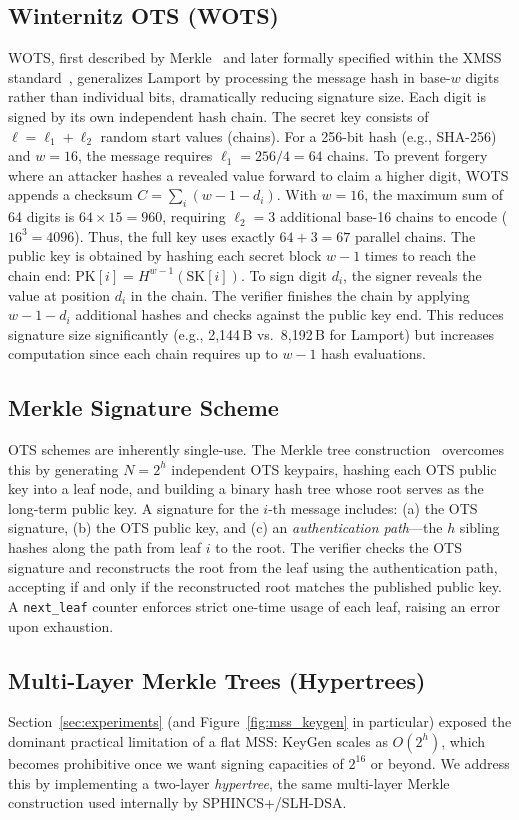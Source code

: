 \documentclass[10pt,a4paper,twocolumn]{article}
\begin{document}
\subsection{Winternitz OTS (WOTS)}
WOTS, first described by Merkle~\cite{merkle1989} and later formally specified within the XMSS standard~\cite{xmss}, generalizes Lamport by processing the message hash in base-$w$ digits rather than individual bits, dramatically reducing signature size. Each digit is signed by its own independent hash chain. The secret key consists of $\ell = \ell_1 + \ell_2$ random start values (chains). For a 256-bit hash (e.g., SHA-256) and $w=16$, the message requires $\ell_1 = 256 / 4 = 64$ chains. 
To prevent forgery where an attacker hashes a revealed value forward to claim a higher digit, WOTS appends a checksum $C = \sum_i (w - 1 - d_i)$. With $w=16$, the maximum sum of 64 digits is $64 \times 15 = 960$, requiring $\ell_2 = 3$ additional base-16 chains to encode ($16^3 = 4096$). Thus, the full key uses exactly $64 + 3 = 67$ parallel chains.
The public key is obtained by hashing each secret block $w-1$ times to reach the chain end: $\text{PK}[i] = H^{w-1}(\text{SK}[i])$. To sign digit $d_i$, the signer reveals the value at position $d_i$ in the chain. The verifier finishes the chain by applying $w-1-d_i$ additional hashes and checks against the public key end. This reduces signature size significantly (e.g., 2,144\,B vs.\ 8,192\,B for Lamport) but increases computation since each chain requires up to $w-1$ hash evaluations.

\subsection{Merkle Signature Scheme}
OTS schemes are inherently single-use. The Merkle tree construction~\cite{merkle1989} overcomes this by generating $N = 2^h$ independent OTS keypairs, hashing each OTS public key into a leaf node, and building a binary hash tree whose root serves as the long-term public key. A signature for the $i$-th message includes: (a) the OTS signature, (b) the OTS public key, and (c) an \emph{authentication path}---the $h$ sibling hashes along the path from leaf $i$ to the root. The verifier checks the OTS signature and reconstructs the root from the leaf using the authentication path, accepting if and only if the reconstructed root matches the published public key. A \texttt{next\_leaf} counter enforces strict one-time usage of each leaf, raising an error upon exhaustion.

\subsection{Multi-Layer Merkle Trees (Hypertrees)}
\label{sec:hypertree}
Section~\ref{sec:experiments} (and Figure~\ref{fig:mss_keygen} in particular) exposed the dominant practical limitation of a flat MSS: KeyGen scales as $O(2^h)$, which becomes prohibitive once we want signing capacities of $2^{16}$ or beyond. We address this by implementing a two-layer \emph{hypertree}, the same multi-layer Merkle construction used internally by SPHINCS+/SLH-DSA.
\end{document}
